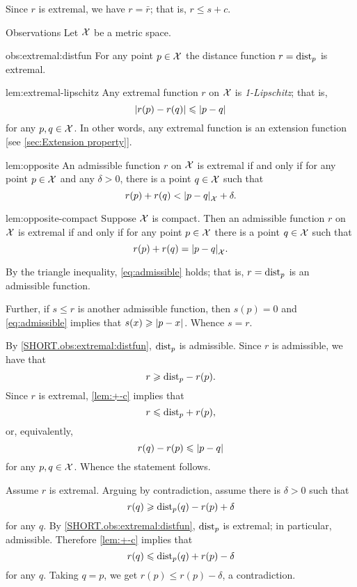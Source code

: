 Since $r$ is extremal, we have $r=\bar r$;
that is, $r\le s+c$.
\qeds

\begin{thm}{Observations}\label{obs:extremal}
Let $\mathcal{X}$ be a metric space.

\begin{subthm}{obs:extremal:distfun}
For any point $p\in\mathcal{X}$ the distance function $r\z=\distfun_p$ is extremal.
\end{subthm}

\begin{subthm}{lem:extremal-lipschitz}
Any extremal function $r$ on $\mathcal{X}$ is \emph{1-Lipschitz};
that is,
\[|r(p)-r(q)|\le \dist{p}{q}{}\]
for any $p,q\in\mathcal{X}$.
In other words, any extremal function is an extension function [see \ref{sec:Extension property}].
\end{subthm}

\begin{subthm}{lem:opposite}
An admissible function $r$ on $\mathcal{X}$ is extremal if and only if
for any point $p\in\mathcal{X}$ and any $\delta>0$, there is a point $q\in \mathcal{X}$
such that 
\[r(p)+r(q)<\dist{p}{q}{\spc{X}}+\delta.\]
\end{subthm}

\begin{subthm}{lem:opposite-compact}
Suppose $\mathcal{X}$ is compact.
Then an admissible function $r$ on $\mathcal{X}$ is extremal if and only if
for any point $p\in\mathcal{X}$ there is a point $q\in \mathcal{X}$
such that 
\[r(p)+r(q)=\dist{p}{q}{\spc{X}}.\]
\end{subthm}

\end{thm}

By the triangle inequality, \ref{eq:admissible} holds;
that is, $r=\mathrm{dist}_p$ is an admissible function.

Further, if $s\le r$ is another admissible function, then $s(p)=0$ and \ref{eq:admissible} implies that $s(x)\z\ge\dist{p}{x}{}$.
Whence $s=r$.

By \ref{SHORT.obs:extremal:distfun}, $\mathrm{dist}_p$ is admissible.
Since $r$ is admissible, we have that
\[r\geqslant \mathrm{dist}_p-r(p).\]
Since $r$ is extremal, \ref{lem:+-c} implies that
\[r\leqslant \mathrm{dist}_p+r(p),\]
or, equivalently,
\[r(q)-r(p)\le \dist{p}{q}{}\]
for any $p,q\in\mathcal{X}$.
Whence the statement follows.

Assume $r$ is extremal.
Arguing by contradiction, assume there is $\delta>0$ such that
\[r(q)\geqslant \mathrm{dist}_p(q)-r(p)+\delta\]
for any $q$.
By \ref{SHORT.obs:extremal:distfun}, $\mathrm{dist}_p$ is extremal; in particular, admissible.
Therefore \ref{lem:+-c} implies that
\[r(q)\leqslant \mathrm{dist}_p(q)+r(p)-\delta\]
for any $q$.
Taking $q=p$, we get $r(p)\le r(p)-\delta$, a contradiction.

